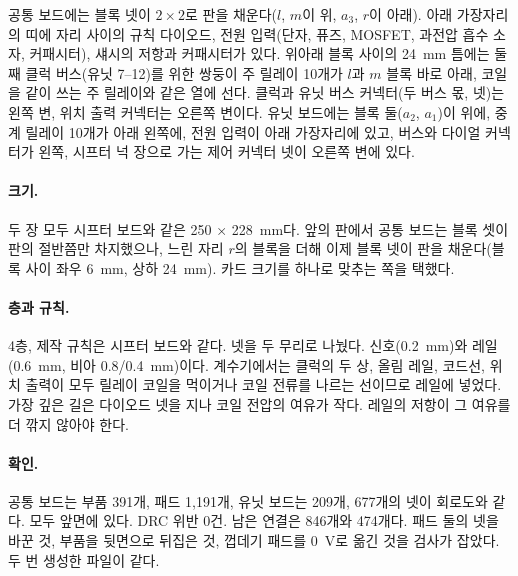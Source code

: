 공통 보드에는 블록 넷이 $2 \times 2$로 판을 채운다($l$, $m$이 위, $a_3$, $r$이 아래). 아래 가장자리의 띠에 자리
사이의 규칙 다이오드, 전원 입력(단자, 퓨즈, MOSFET, 과전압 흡수 소자, 커패시터), 섀시의 저항과 커패시터가 있다.
위아래 블록 사이의 24~mm 틈에는 둘째 클럭 버스(유닛 7--12)를 위한 쌍둥이 주 릴레이 10개가 $l$과 $m$ 블록 바로 아래,
코일을 같이 쓰는 주 릴레이와 같은 열에 선다. 클럭과 유닛 버스 커넥터(두 버스 몫, 넷)는 왼쪽 변, 위치 출력 커넥터는 오른쪽 변이다. 유닛 보드에는 블록 둘($a_2$, $a_1$)이 위에,
중계 릴레이 10개가 아래 왼쪽에, 전원 입력이 아래 가장자리에 있고, 버스와 다이얼 커넥터가 왼쪽, 시프터 넉 장으로
가는 제어 커넥터 넷이 오른쪽 변에 있다.

\paragraph{크기.} 두 장 모두 시프터 보드와 같은 250 × 228~mm다. 앞의 판에서 공통 보드는 블록 셋이 판의 절반쯤만
차지했으나, 느린 자리 $r$의 블록을 더해 이제 블록 넷이 판을 채운다(블록 사이 좌우 6~mm, 상하 24~mm). 카드 크기를
하나로 맞추는 쪽을 택했다.

\paragraph{층과 규칙.} 4층, 제작 규칙은 시프터 보드와 같다. 넷을 두 무리로 나눴다. 신호(0.2~mm)와 레일
(0.6~mm, 비아 0.8/0.4~mm)이다. 계수기에서는 클럭의 두 상, 올림 레일, 코드선, 위치 출력이 모두 릴레이 코일을 먹이거나
코일 전류를 나르는 선이므로 레일에 넣었다. 가장 깊은 길은 다이오드 넷을 지나 코일 전압의 여유가 작다. 레일의
저항이 그 여유를 더 깎지 않아야 한다.

\paragraph{확인.} 공통 보드는 부품 391개, 패드 1,191개, 유닛 보드는 209개, 677개의 넷이 회로도와 같다. 모두 앞면에
있다. DRC 위반 0건. 남은 연결은 846개와 474개다. 패드 둘의 넷을 바꾼 것, 부품을 뒷면으로 뒤집은 것, 껍데기 패드를
0~V로 옮긴 것을 검사가 잡았다. 두 번 생성한 파일이 같다.


